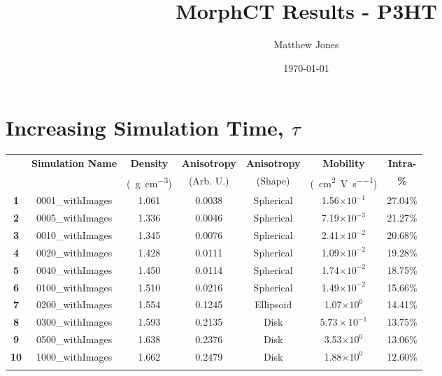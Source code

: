 \documentclass[12pt]{article}
\title{MorphCT Results - P3HT}
\author{Matthew Jones}
\date{\today}
\def\mobunits{\square\centi\meter\per\volt\per\second}
\def\gcm{\gram\per\cubic\centi\meter}
\def\ccg{\cellcolor{gray}}
\begin{document}
\maketitle

\section{Increasing Simulation Time, $\tau$}

\begin{center}
\begin{tabular}{| c | c | c | c | c | c | c |}
\hline
\rule{0pt}{2.5ex} 
\multirow{2}{*}{\textbf{ID}}&\multirow{2}{*}{\textbf{Simulation Name}}&\textbf{Density}&\textbf{Anisotropy}&\textbf{Anisotropy}&\textbf{Mobility}&\textbf{Intra-}\\
                            &&(\SI{}{\gcm})&(Arb. U.)&(Shape)&(\SI{}{\mobunits})&\textbf{\%}\\
\hhline{|=======|}
\textbf{\ccg1}&\rule{0pt}{2.5ex}\ccg 0001\_withImages&\ccg 1.061&\ccg 0.0038&\ccg Spherical&\ccg1.56$\times 10^{-1}$&\ccg27.04\%\\
\textbf{2}&\rule{0pt}{2.5ex}0005\_withImages&1.336&0.0046&Spherical&7.19$\times 10^{-3}$&21.27\%\\
\textbf{\ccg3}&\rule{0pt}{2.5ex}\ccg 0010\_withImages&\ccg 1.345&\ccg 0.0076&\ccg Spherical&\ccg2.41$\times 10^{-2}$&\ccg20.68\%\\
\textbf{4}&\rule{0pt}{2.5ex}0020\_withImages&1.428&0.0111&Spherical&1.09$\times 10^{-2}$&19.28\%\\
\textbf{\ccg5}&\rule{0pt}{2.5ex}\ccg 0040\_withImages&\ccg 1.450&\ccg 0.0114&\ccg Spherical&\ccg1.74$\times 10^{-2}$&\ccg18.75\%\\
\textbf{6}&\rule{0pt}{2.5ex}0100\_withImages&1.510&0.0216&Spherical&1.49$\times 10^{-2}$&15.66\%\\
\textbf{\ccg7}&\rule{0pt}{2.5ex}\ccg 0200\_withImages&\ccg 1.554&\ccg 0.1245&\ccg Ellipsoid&\ccg1.07$\times 10^{0}$&\ccg14.41\%\\
\textbf{8}&\rule{0pt}{2.5ex}0300\_withImages&1.593&0.2135&Disk&$5.73\times 10^{-1}$&13.75\%\\
\textbf{\ccg9}&\rule{0pt}{2.5ex}\ccg 0500\_withImages&\ccg 1.638&\ccg 0.2376&\ccg Disk&\ccg3.53$\times 10^{0}$&\ccg13.06\%\\
\textbf{10}&\rule{0pt}{2.5ex}1000\_withImages&1.662&0.2479&Disk&1.88$\times 10^{0}$&12.60\%\\
\hhline{-------}
\end{tabular}\label{table:mob}
\end{center}
\end{document}
